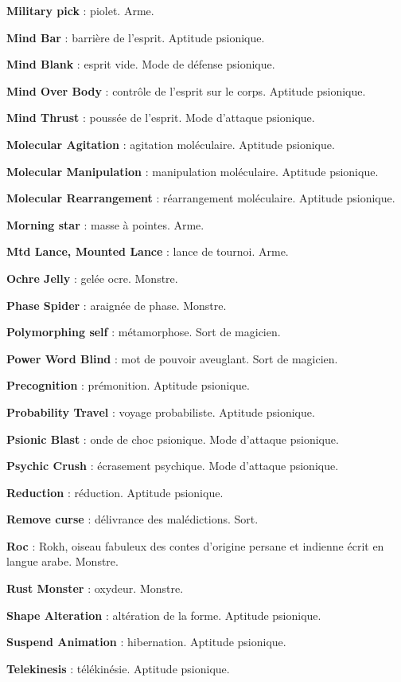 \documentclass[11pt]{article}
\begin{document}
{\textbf{Military pick} : piolet. Arme.

\textbf{Mind Bar} : barrière de l'esprit. Aptitude psionique.

\textbf{Mind Blank} : esprit vide. Mode de défense psionique.

\textbf{Mind Over Body} : contrôle de l'esprit sur le corps. Aptitude psionique.

\textbf{Mind Thrust} : poussée de l'esprit. Mode d'attaque psionique.

\textbf{Molecular Agitation} : agitation moléculaire. Aptitude psionique.

\textbf{Molecular Manipulation} : manipulation moléculaire. Aptitude psionique.

\textbf{Molecular Rearrangement} : réarrangement moléculaire. Aptitude psionique.

\textbf{Morning star} : masse à pointes. Arme.

\textbf{Mtd Lance, Mounted Lance} : lance de tournoi. Arme.

\textbf{Ochre Jelly} : gelée ocre. Monstre.

\textbf{Phase Spider} : araignée de phase. Monstre.

\textbf{Polymorphing self} : métamorphose. Sort de magicien.

\textbf{Power Word Blind} : mot de pouvoir aveuglant. Sort de magicien.

\textbf{Precognition} : prémonition. Aptitude psionique.

\textbf{Probability Travel} : voyage probabiliste. Aptitude psionique.

\textbf{Psionic Blast} : onde de choc psionique. Mode d'attaque psionique.

\textbf{Psychic Crush} : écrasement psychique. Mode d'attaque psionique.

\textbf{Reduction} : réduction. Aptitude psionique.

\textbf{Remove curse} : délivrance des malédictions. Sort.

\textbf{Roc} : Rokh, oiseau fabuleux des contes d'origine persane et indienne écrit en langue arabe. Monstre.

\textbf{Rust Monster} : oxydeur. Monstre.

\textbf{Shape Alteration} : altération de la forme. Aptitude psionique.

\textbf{Suspend Animation} : hibernation. Aptitude psionique.

\textbf{Telekinesis} : télékinésie. Aptitude psionique.

}
\end{document}
